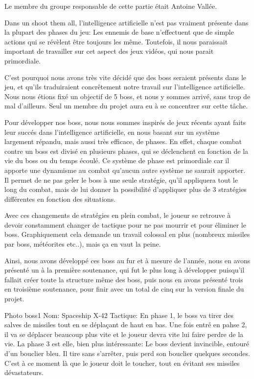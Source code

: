\par Le membre du groupe responsable de cette partie était Antoine Vallée.

\par Dans un shoot them all, l'intelligence artificielle n'est pas vraiment présente dans la plupart des phases du jeu: Les ennemis de base n'effectuent que de simple actions qui se révèlent être toujours les même. Toutefois, il nous paraissait important de travailler sur cet aspect des jeux vidéos, qui nous parait primordiale.
\par C'est pourquoi nous avons très vite décidé que des boss seraient présents dans le jeu, et qu'ils traduiraient concrêtement notre travail sur l'intelligence artificielle. Nous nous étions fixé un objectif de 5 boss, et nous y sommes arrivé, sans trop de mal d'ailleurs. Seul un membre du projet aura eu à se concentrer sur cette tâche.
\par Pour développer nos boss, nous nous sommes inspirés de jeux récents ayant faits leur succés dans l'intelligence artificielle, en nous basant sur un système largement répandu, mais aussi très efficace, de phases. En effet, chaque combat contre un boss est divisé en plusieurs phases, qui se déclenchent en fonction de la vie du boss ou du temps écoulé. Ce système de phase est primordiale car il apporte une dynamisme au combat qu'aucun autre système ne saurait apporter. Il permet de ne pas geler le boss à une seule stratégie, qu'il appliquera tout le long du combat, mais de lui donner la possibilité d'appliquer plus de 3 stratégies différentes en fonction des situations.
\par Avec ces changements de stratégies en plein combat, le joueur se retrouve à devoir constamment changer de tactique pour ne pas mourrir et pour éliminer le boss. Graphiquement cela demande un travail colossal en plus (nombreux missiles par boss, météorites etc..), mais ça en vaut la peine.
\par Ainsi, nous avons développé ces boss au fur et à mesure de l'année, nous en avons présenté un à la première soutenance, qui fut le plus long à développer puisqu'il fallait créer toute la structure même des boss, puis nous en avons présenté trois en troisième soutenance, pour finir avec un total de cinq sur la version finale du projet.

Photo boss1   Nom: Spaceship X-42
               Tactique: En phase 1, le boss va tirer des salves de missiles tout en se déplaçant de haut en bas. Une fois entré en pahse 2, il va se déplacer beaucoup plus vite et le joueur devra vite lui faire perdre de la vie. La phase 3 est elle, bien plus intéressante: Le boss devient invincible, entouré d'un bouclier bleu. Il tire sans s'arrêter, puis perd son bouclier quelques secondes. C'est à ce moment là que le joueur doit le toucher, tout en évitant ses missiles dévastateurs.
			   
